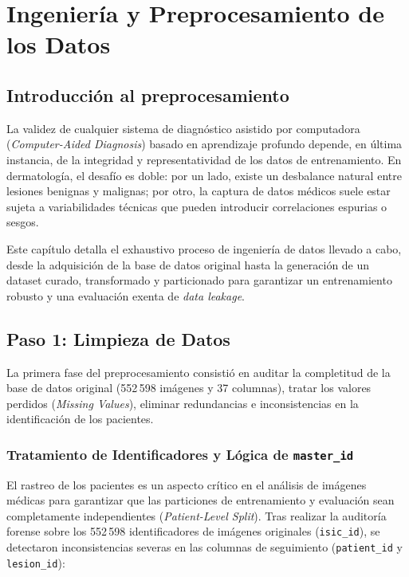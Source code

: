 \chapter{Ingeniería y Preprocesamiento de los Datos}

\section{Introducción al preprocesamiento}

La validez de cualquier sistema de diagnóstico asistido por computadora (\textit{Computer-Aided Diagnosis}) basado en aprendizaje profundo depende, en última instancia, de la integridad y representatividad de los datos de entrenamiento. En dermatología, el desafío es doble: por un lado, existe un desbalance natural entre lesiones benignas y malignas; por otro, la captura de datos médicos suele estar sujeta a variabilidades técnicas que pueden introducir correlaciones espurias o sesgos.

Este capítulo detalla el exhaustivo proceso de ingeniería de datos llevado a cabo, desde la adquisición de la base de datos original hasta la generación de un dataset curado, transformado y particionado para garantizar un entrenamiento robusto y una evaluación exenta de \textit{data leakage}.

\section{Paso 1: Limpieza de Datos}

La primera fase del preprocesamiento consistió en auditar la completitud de la base de datos original (552\,598 imágenes y 37 columnas), tratar los valores perdidos (\textit{Missing Values}), eliminar redundancias e inconsistencias en la identificación de los pacientes.

\subsection{Tratamiento de Identificadores y Lógica de \texttt{master\_id}}
El rastreo de los pacientes es un aspecto crítico en el análisis de imágenes médicas para garantizar que las particiones de entrenamiento y evaluación sean completamente independientes (\textit{Patient-Level Split}). Tras realizar la auditoría forense sobre los 552\,598 identificadores de imágenes originales (\texttt{isic\_id}), se detectaron inconsistencias severas en las columnas de seguimiento (\texttt{patient\_id} y \texttt{lesion\_id}):


